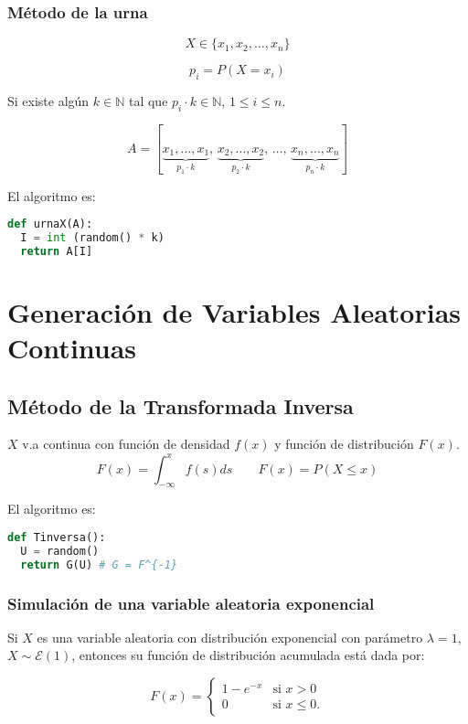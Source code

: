 \documentclass[11pt, a4paper]{article}
\theoremstyle{definition}
\begin{document}
\subsubsection{Método de la urna}
\[ X \in \{x_1, x_2, \ldots, x_n\} \]

\[ p_i = P(X = x_i) \]

Si existe algún $k \in \mathbb{N}$ tal que $p_i \cdot k \in \mathbb{N}$, $1 \leq i \leq n$.

\[
A = \left[
\underbrace{x_1, \ldots, x_1}_{p_1 \cdot k},\,
\underbrace{x_2, \ldots, x_2}_{p_2 \cdot k},\,
\ldots,\,
\underbrace{x_n, \ldots, x_n}_{p_n \cdot k}
\right]
\]

El algoritmo es:
\begin{lstlisting}[language=Python]
def urnaX(A):
  I = int (random() * k)
  return A[I]
\end{lstlisting}

\newpage

\section{Generación de Variables Aleatorias Continuas}

\subsection{Método de la Transformada Inversa}

$X$ v.a continua con función de densidad \( f(x) \) y función de distribución \( F(x) \).
\[
F(x) = \int_{-\infty}^{x} f(s) ds \qquad F(x) = P(X \leq x) \]

El algoritmo es:
\begin{lstlisting}[language=Python]
def Tinversa():
  U = random()
  return G(U) # G = F^{-1}
\end{lstlisting}

\subsubsection{Simulación de una variable aleatoria exponencial}
Si \( X \) es una variable aleatoria con distribución exponencial con parámetro \( \lambda = 1 \), \( X \sim \mathcal{E}(1) \), entonces su función de distribución acumulada está dada por:

\[
F(x) =
\begin{cases} 
1 - e^{-x} & \text{si } x > 0 \\
0 & \text{si } x \leq 0.
\end{cases}
\]
\end{document}
